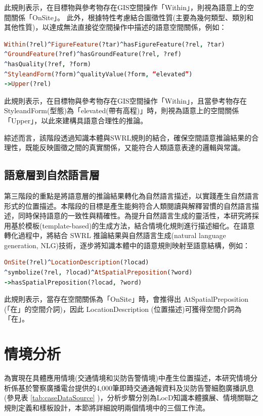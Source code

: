 此規則表示，在目標物與參考物存在GIS空間操作「Within」，則視為語意上的空間關係「OnSite」。
此外，根據特性考慮結合圖徵性質(主要為幾何類型、類別和其他性質)，以達成無法直接從空間操作中描述的語意空間關係，例如：

\begin{lstlisting}[language=Prolog, basicstyle=\ttfamily, xleftmargin=2em]
Within(?rel)^FigureFeature(?tar)^hasFigureFeature(?rel, ?tar)
^GroundFeature(?ref)^hasGroundFeature(?rel, ?ref)
^hasQuality(?ref, ?form)
^StyleandForm(?form)^qualityValue(?form, “elevated”)
->Upper(?rel)
\end{lstlisting}

此規則表示，在目標物與參考物存在GIS空間操作「Within」，且當參考物存在StyleandForm(型態)為「elevated(帶有高程)」時，則視為語意上的空間關係「Upper」，以此來建構具語意合理性的推論。

綜述而言，該階段透過知識本體與SWRL規則的結合，確保空間語意推論結果的合理性，既能反映圖徵之間的真實關係，又能符合人類語意表達的邏輯與常識。

\subsection{語意層到自然語言層}

第三階段的重點是將語意層的推論結果轉化為自然語言描述，以實踐產生自然語言形式的位置描述。本階段的目標是產生能夠符合人類閱讀與解釋習慣的自然語言描述，同時保持語意的一致性與精確性。為提升自然語言生成的靈活性，本研究將採用基於模板(template-based)的生成方法，結合情境化規則進行描述細化。在語意轉化過程中，將結合 SWRL 推論結果與自然語言生成(natural language generation, NLG)技術，逐步將知識本體中的語意規則映射至語意結構，例如：

\begin{lstlisting}[language=Prolog, basicstyle=\ttfamily, xleftmargin=2em]
OnSite(?rel)^LocationDescription(?locad)
^symbolize(?rel, ?locad)^AtSpatialPreposition(?word)
->hasSpatialPreposition(?locad, ?word)
\end{lstlisting}

此規則表示，當存在空間關係為「OnSite」時，會推得出 AtSpatialPreposition (「在」的空間介詞)，因此 LocationDescription (位置描述)可獲得空間介詞為「在」。

\section{情境分析}

為實現在具體應用情境(交通情境和災防告警情境)中產生位置描述，本研究情境分析係基於警察廣播電台提供的4,000筆即時交通通報資料及災防告警細胞廣播訊息(參見表 \ref{tab:caseDataSource} )，分析步驟分別為LocD知識本體擴展、情境關聯之規則定義和樣板設計，本節將詳細說明兩個情境中的三個工作流。


